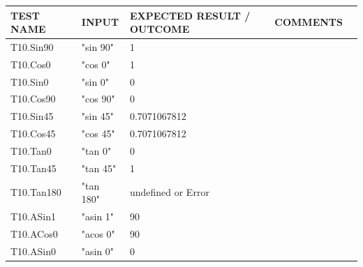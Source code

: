 \documentclass[a4paper, oneside, 11pt]{report}
\begin{document}
    \begin{tabular}{|p{1.5in}|p{1.5in}|p{1.6in}|p{1.6in}|p{2.4in}|}
        \hline
        TEST NAME       & INPUT                     & EXPECTED RESULT / OUTCOME              & COMMENTS                                \\
        \hline
        T10.Sin90        & "sin 90"                   & 1                                      &                                         \\
        \hline
        T10.Cos0         & "cos 0"                   & 1                                      &                                         \\
        \hline
        T10.Sin0         & "sin 0"                    & 0                                      &                                         \\
        \hline
        T10.Cos90        & "cos 90"                  & 0                                      &                                         \\
        \hline
        T10.Sin45        & "sin 45"                   & 0.7071067812                           &                                         \\
        \hline
        T10.Cos45        & "cos 45"                  & 0.7071067812                           &                                         \\
        \hline
        T10.Tan0         & "tan 0"                   & 0                                      &                                         \\
        \hline
        T10.Tan45        & "tan 45"                  & 1                                      &                                         \\
        \hline
        T10.Tan180       & "tan 180"                 & undefined or Error                     &                                         \\
        \hline
        T10.ASin1        & "asin 1"                   & 90                                     &                                         \\
        \hline
        T10.ACos0        & "acos 0"                   & 90                                     &                                         \\
        \hline
        T10.ASin0        & "asin 0"                   & 0                                      &                                         \\

\end{tabular}
\end{document}

